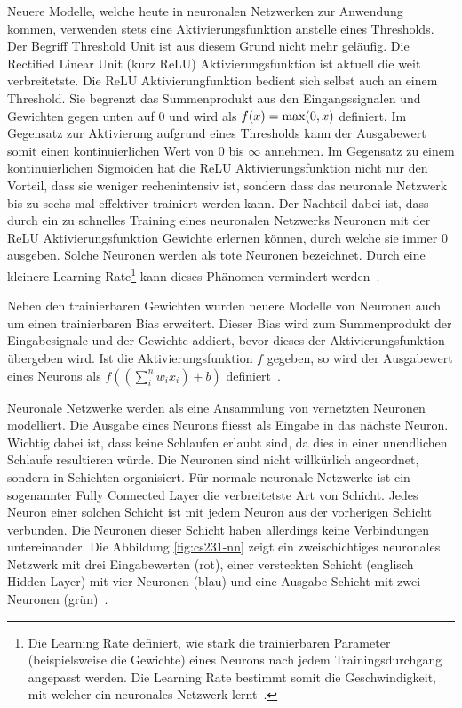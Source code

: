 Neuere Modelle, welche heute in neuronalen Netzwerken zur Anwendung kommen, verwenden stets eine Aktivierungsfunktion anstelle eines Thresholds. Der Begriff Threshold Unit ist aus diesem Grund nicht mehr geläufig. Die Rectified Linear Unit (kurz ReLU) Aktivierungsfunktion ist aktuell die weit verbreitetste. Die ReLU Aktivierungfunktion bedient sich selbst auch an einem Threshold. Sie begrenzt das Summenprodukt aus den Eingangssignalen und Gewichten gegen unten auf 0 und wird als $f(x) = \textnormal{max}(0, x)$ definiert. Im Gegensatz zur Aktivierung aufgrund eines Thresholds kann der Ausgabewert somit einen kontinuierlichen Wert von 0 bis $\infty$ annehmen. Im Gegensatz zu einem kontinuierlichen Sigmoiden hat die ReLU Aktivierungsfunktion nicht nur den Vorteil, dass sie weniger rechenintensiv ist, sondern dass das neuronale Netzwerk bis zu sechs mal effektiver trainiert werden kann. Der Nachteil dabei ist, dass durch ein zu schnelles Training eines neuronalen Netzwerks Neuronen mit der ReLU Aktivierungsfunktion Gewichte erlernen können, durch welche sie immer 0 ausgeben. Solche Neuronen werden als tote Neuronen bezeichnet. Durch eine kleinere Learning Rate\footnote{Die Learning Rate definiert, wie stark die trainierbaren Parameter (beispielsweise die Gewichte) eines Neurons nach jedem Trainingsdurchgang angepasst werden. Die Learning Rate bestimmt somit die Geschwindigkeit, mit welcher ein neuronales Netzwerk lernt~\autocite{Goodfellow2016}.} kann dieses Phänomen vermindert werden~\autocite{cs231NN}.

Neben den trainierbaren Gewichten wurden neuere Modelle von Neuronen auch um einen trainierbaren Bias erweitert. Dieser Bias wird zum Summenprodukt der Eingabesignale und der Gewichte addiert, bevor dieses der Aktivierungsfunktion übergeben wird. Ist die Aktivierungsfunktion $f$ gegeben, so wird der Ausgabewert eines Neurons als $f((\sum_{i}^{n}{w_{i}x_{i}})+b)$ definiert~\autocite{cs231NN}.

Neuronale Netzwerke werden als eine Ansammlung von vernetzten Neuronen modelliert. Die Ausgabe eines Neurons fliesst als Eingabe in das nächste Neuron. Wichtig dabei ist, dass keine Schlaufen erlaubt sind, da dies in einer unendlichen Schlaufe resultieren würde. Die Neuronen sind nicht willkürlich angeordnet, sondern in Schichten organisiert. Für normale neuronale Netzwerke ist ein sogenannter Fully Connected Layer die verbreitetste Art von Schicht. Jedes Neuron einer solchen Schicht ist mit jedem Neuron aus der vorherigen Schicht verbunden. Die Neuronen dieser Schicht haben allerdings keine Verbindungen untereinander. Die Abbildung \ref{fig:cs231-nn} zeigt ein zweischichtiges neuronales Netzwerk mit drei Eingabewerten (rot), einer versteckten Schicht (englisch Hidden Layer) mit vier Neuronen (blau) und eine Ausgabe-Schicht mit zwei Neuronen (grün)~\autocite{cs231NN}.

